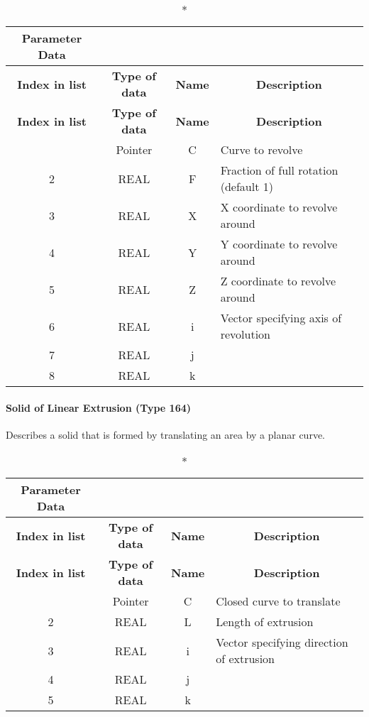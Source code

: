 \begin{longtable}[H]{|c|c|c|l|}
  \caption*{Parameter Data} \\

  \hline
  \multicolumn{1}{|c|}{\textbf{Index in list}} & \multicolumn{1}{|c|}{\textbf{Type of data}} &
  \multicolumn{1}{|c|}{\textbf{Name}} & \multicolumn{1}{|c|}{\textbf{Description}} \\ \hline
  \endfirsthead
  \hline
  
  \multicolumn{1}{|c|}{\textbf{Index in list}} & \multicolumn{1}{|c|}{\textbf{Type of data}} &
  \multicolumn{1}{|c|}{\textbf{Name}} & \multicolumn{1}{|c|}{\textbf{Description}} \\ \hline
  \endhead
  
  \endfoot

  \endlastfoot
1 & Pointer & C & Curve to revolve\\ \hline
2 & REAL & F & Fraction of full rotation (default 1)\\ \hline
3 & REAL & X & X coordinate to revolve around\\ \hline
4 & REAL & Y & Y coordinate to revolve around\\ \hline
5 & REAL & Z & Z coordinate to revolve around\\ \hline
6 & REAL & i & Vector specifying axis of revolution\\ \hline
7 & REAL & j &\\ \hline
8 & REAL & k &\\ \hline
\end{longtable}

\paragraph{Solid of Linear Extrusion (Type
164)}\label{solid-of-linear-extrusion-type-164}

Describes a solid that is formed by translating an area by a planar
curve.

\begin{longtable}[H]{|c|c|c|l|}
  \caption*{Parameter Data} \\

  \hline
  \multicolumn{1}{|c|}{\textbf{Index in list}} & \multicolumn{1}{|c|}{\textbf{Type of data}} &
  \multicolumn{1}{|c|}{\textbf{Name}} & \multicolumn{1}{|c|}{\textbf{Description}} \\ \hline
  \endfirsthead
  \hline
  
  \multicolumn{1}{|c|}{\textbf{Index in list}} & \multicolumn{1}{|c|}{\textbf{Type of data}} &
  \multicolumn{1}{|c|}{\textbf{Name}} & \multicolumn{1}{|c|}{\textbf{Description}} \\ \hline
  \endhead
  
  \endfoot

  \endlastfoot
1 & Pointer & C & Closed curve to translate\\ \hline
2 & REAL & L & Length of extrusion\\ \hline
3 & REAL & i & Vector specifying direction of extrusion\\ \hline
4 & REAL & j &\\ \hline
5 & REAL & k &\\ \hline
\end{longtable}

